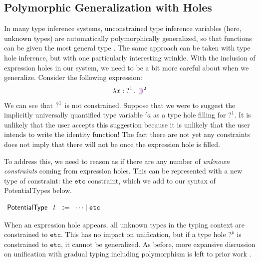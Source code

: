\subsection{Polymorphic Generalization with Holes}
\label{sec:polymorphicGlobal}
In many type inference systems, unconstrained type inference variables (here, unknown types) are automatically polymorphically generalized, so that
functions can be given the most general type \cite{garcia2015}. The same approach can be taken with type hole inference, but with one particularly interesting wrinkle. With the inclusion of expression holes in our system, we need to be a bit more careful about when we generalize. Consider the following expression:
$$\ECLam{x}{\TUnknown^1}{\EEHole^2}$$
We can see that $\operatorname{?}^1$ is not constrained. Suppose that we were to suggest the implicitly universally quantified type variable $'a$ as a type hole filling for $?^1$. It is unlikely that the user accepts this suggestion because it is unlikely that the user intends to write the identity function!
The fact there are not yet any constraints does not imply that there will not be once the expression hole is filled.

To address this, we need to reason as if there are any number of \emph{unknown constraints} coming from expression holes.  This can be represented with a new type of constraint: the $\mathtt{etc}$ constraint, which we add to our syntax of \textsf{PotentialType}s below. 
\begin{center}
$\arraycolsep=4pt\begin{array}{rrcl}
  \textsf{PotentialType} & t & \Coloneqq & \dots \mid \mathtt{etc}
\end{array}$
\end{center}
When an expression hole appears, all unknown types in the typing context are constrained to $\mathtt{etc}$. This has no impact on unification, but if a type hole $?^p$ is constrained to $\mathtt{etc}$, it cannot be generalized. As before, more expansive discussion on unification with gradual typing including polymorphism is left to prior work \cite{garcia2015}.

